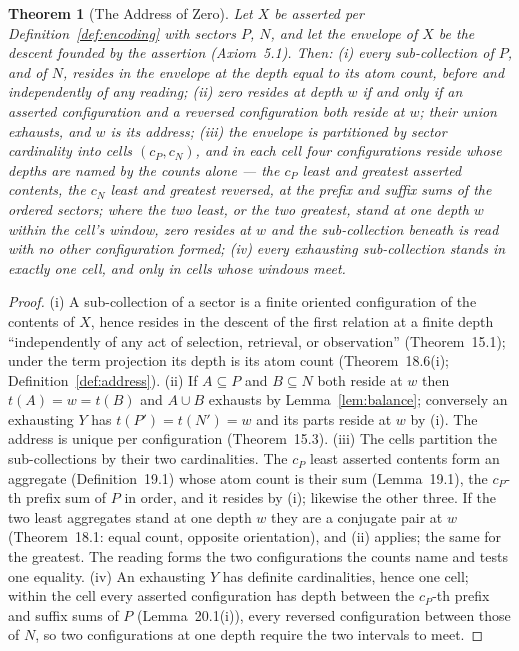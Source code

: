 \documentclass[pdflatex,sn-mathphys-num]{sn-jnl}
\theoremstyle{thmstyleone}%
\newtheorem{theorem}{Theorem}[section]
\theoremstyle{thmstyletwo}%
\theoremstyle{thmstylethree}%
\newtheorem{theorem}{Theorem}[section]
\newcommand{\q}[1]{``#1''}        %
\begin{document}
\begin{theorem}[The Address of Zero]\label{thm:address}
Let $X$ be asserted per Definition~\ref{def:encoding} with sectors $P$, $N$, and let the envelope of $X$ be the descent founded by the assertion (Axiom~5.1). Then: (i) every sub-collection of $P$, and of $N$, resides in the envelope at the depth equal to its atom count, before and independently of any reading; (ii) zero resides at depth $w$ if and only if an asserted configuration and a reversed configuration both reside at $w$; their union exhausts, and $w$ is its address; (iii) the envelope is partitioned by sector cardinality into cells $(c_P,c_N)$, and in each cell four configurations reside whose depths are named by the counts alone --- the $c_P$ least and greatest asserted contents, the $c_N$ least and greatest reversed, at the prefix and suffix sums of the ordered sectors; where the two least, or the two greatest, stand at one depth $w$ within the cell's window, zero resides at $w$ and the sub-collection beneath is read with no other configuration formed; (iv) every exhausting sub-collection stands in exactly one cell, and only in cells whose windows meet.
\end{theorem}
\begin{proof}
(i) A sub-collection of a sector is a finite oriented configuration of the contents of $X$, hence resides in the descent of the first relation at a finite depth \q{independently of any act of selection, retrieval, or observation} (Theorem~15.1); under the term projection its depth is its atom count (Theorem~18.6(i); Definition~\ref{def:address}). (ii) If $A\subseteq P$ and $B\subseteq N$ both reside at $w$ then $t(A)=w=t(B)$ and $A\cup B$ exhausts by Lemma~\ref{lem:balance}; conversely an exhausting $Y$ has $t(P')=t(N')=w$ and its parts reside at $w$ by (i). The address is unique per configuration (Theorem~15.3). (iii) The cells partition the sub-collections by their two cardinalities. The $c_P$ least asserted contents form an aggregate (Definition~19.1) whose atom count is their sum (Lemma~19.1), the $c_P$-th prefix sum of $P$ in order, and it resides by (i); likewise the other three. If the two least aggregates stand at one depth $w$ they are a conjugate pair at $w$ (Theorem~18.1: equal count, opposite orientation), and (ii) applies; the same for the greatest. The reading forms the two configurations the counts name and tests one equality. (iv) An exhausting $Y$ has definite cardinalities, hence one cell; within the cell every asserted configuration has depth between the $c_P$-th prefix and suffix sums of $P$ (Lemma~20.1(i)), every reversed configuration between those of $N$, so two configurations at one depth require the two intervals to meet.
\end{proof}
\end{document}
